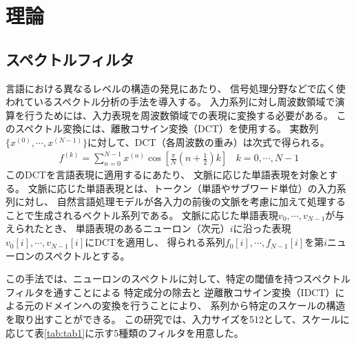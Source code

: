 \documentclass{jsarticle}
\begin{document}
\section{理論}
\subsection{スペクトルフィルタ}
言語における異なるレベルの構造の発見にあたり、
信号処理分野などで広く使われているスペクトル分析の手法を導入する。
入力系列に対し周波数領域で演算を行うためには、入力表現を周波数領域での表現に変換する必要がある。
このスペクトル変換には、離散コサイン変換（DCT）を使用する。
実数列$\{x^{(0)},\cdots, x^{(N-1)}\}$に対して、DCT（各周波数の重み）は次式で得られる。
\begin{eqnarray}
  f^{(k)}= \sum_{n=0}^{N-1}x^{(n)}\cos{[\frac{\pi}{N}(n+\frac{1}{2})k]} \ \ \ \ k=0,\cdots,N-1
\end{eqnarray}
このDCTを言語表現に適用するにあたり、
文脈に応じた単語表現を対象とする。
文脈に応じた単語表現とは、トークン（単語やサブワード単位）の入力系列に対し、
自然言語処理モデルが各入力の前後の文脈を考慮に加えて処理することで生成されるベクトル系列である。
文脈に応じた単語表現$v_0,\cdots,v_{N-1}$が与えられたとき、
単語表現のあるニューロン（次元）$i$に沿った表現$v_0[i],\cdots,v_{N-1}[i]$にDCTを適用し、
得られる系列$f_0[i],\cdots,f_{N-1}[i]$を第$i$ニューロンのスペクトルとする。

この手法では、ニューロンのスペクトルに対して、特定の閾値を持つスペクトルフィルタを通すことによる
特定成分の除去と
逆離散コサイン変換（IDCT）による元のドメインへの変換を行うことにより、
系列から特定のスケールの構造を取り出すことができる。
この研究では、入力サイズを512として、スケールに応じて表\ref{tab:tab1}に示す5種類のフィルタを用意した。
\end{document}
